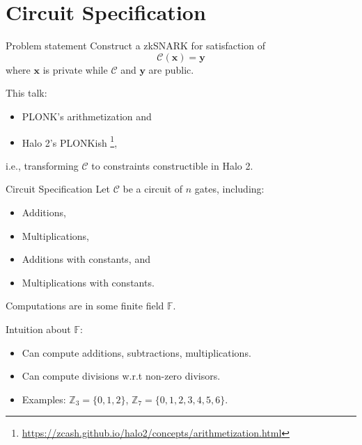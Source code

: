 \documentclass{beamer}
\begin{document}
	\section{Circuit Specification}
	\begin{frame}{Problem statement}
		Construct a zkSNARK for satisfaction of 
		\begin{equation*}
			\mathcal{C}(\mathbf{x}) = \mathbf{y}
		\end{equation*}
		where $\mathbf{x}$ is private while $\mathcal{C}$ and $\mathbf{y}$ are public.
		
		This talk: 
		\begin{itemize}
			\item PLONK's arithmetization \cite{iacr/GabizonWC19} and 
			\item Halo 2's PLONKish \footnote{\url{https://zcash.github.io/halo2/concepts/arithmetization.html}}, 
		\end{itemize}
		
		i.e., transforming $\mathcal{C}$ to constraints constructible in Halo 2.
	\end{frame}

	\begin{frame}{Circuit Specification}
		Let $\mathcal{C}$ be a circuit of $n$ gates, including:
		\begin{itemize}
			\item Additions,
			\item Multiplications,
			\item Additions with constants, and 
			\item Multiplications with constants.
		\end{itemize}
		Computations are in some finite field $\mathbb{F}$.
		
		Intuition about $\mathbb{F}$:
		\begin{itemize}
			\item Can compute additions, subtractions, multiplications.
			\item Can compute divisions w.r.t non-zero divisors.
			\item Examples: $\mathbb{Z}_3 = \{0, 1, 2\}$, $\mathbb{Z}_7 = \{0, 1, 2, 3, 4, 5, 6\}$.
		\end{itemize}
	\end{frame}
\end{document}

